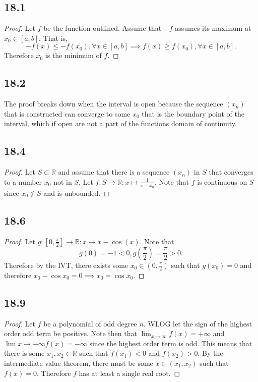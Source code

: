 \documentclass[12pt,titlepage]{extarticle}
\begin{document}
\subsection*{18.1}
\begin{proof}
    Let $f$ be the function outlined. Assume that $-f$ assumes its maximum at $x_0 \in [a,b]$. That is,
    \[
        -f(x) \leq -f(x_0), \forall x\in [a,b] \implies f(x) \geq f(x_0), \forall x \in [a,b]
    .\]
    Therefore $x_0$ is the minimum of $f$.
\end{proof}

\subsection*{18.2}
The proof breaks down when the interval is open because the sequence $(x_n)$ that is constructed can converge to some $x_0$ that is the boundary point of the interval, which if open are not a part of the functions domain of continuity.

\subsection*{18.4}
\begin{proof}
    Let $S \subset \mathbb{R}$ and assume that there is a sequence $(x_n)$ in $S$ that converges to a number $x_0$ not in $S$. Let $f : S \to \mathbb{R} : x \mapsto \frac{1}{x - x_0}$. Note that $f$ is continuous on $S$ since $x_0 \notin S$ and is unbounded.
\end{proof}

\subsection*{18.6}
\begin{proof}
    Let $g : [0, \frac{\pi}{2}] \to \mathbb{R} : x\mapsto x - \cos(x)$. Note that
    \[
        g(0) = -1 < 0, g(\frac{\pi}{2}) = \frac{\pi}{2} > 0
    .\]
    Therefore by the IVT, there exists some $x_0 \in (0, \frac{\pi}{2})$ such that $g(x_0) = 0$ and therefore $x_0 - \cos x_0 = 0 \implies x_0 = \cos x_0$.
\end{proof}

\subsection*{18.9}
\begin{proof}
    Let $f$ be a polynomial of odd degree $n$. WLOG let the sign of the highest order odd term be positive. Note then that $\lim_{x\to \infty} f(x) = +\infty$ and $\lim{x\to -\infty} f(x) = -\infty$ since the highest order term is odd. This means that there is some $x_1, x_2 \in \mathbb{R}$ such that $f(x_1) < 0$ and $f(x_2) > 0$. By the intermediate value theorem, there must be some $x \in (x_1, x_2)$ such that $f(x) = 0$. Therefore $f$ has at least a single real root.
\end{proof}
\end{document}
